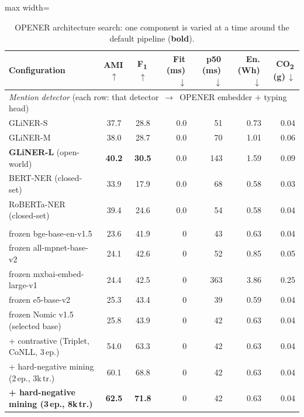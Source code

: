 \documentclass[pdflatex,sn-basic,Numbered]{sn-jnl}
\begin{document}
\begin{table}[!t]
\centering
\caption{OPENER architecture search: one component is varied at a time around the default pipeline (\textbf{bold}).}
\label{tab:ablation}
\small
\begin{adjustbox}{max width=\textwidth}
\begin{threeparttable}
\begin{tabular}{lccrrrr}
\toprule
Configuration & AMI\,$\uparrow$ & F\textsubscript{1}\,$\uparrow$ & Fit\,(ms)\,$\downarrow$ & p50\,(ms)\,$\downarrow$ & En.\,(Wh)\,$\downarrow$ & CO\textsubscript{2}\,(g)\,$\downarrow$ \\
\midrule
\multicolumn{7}{l}{\emph{Mention detector} (each row: that detector \,$\rightarrow$\, OPENER embedder $+$ typing head)} \\
\quad GLiNER-S                       & 37.7 & 28.8 & 0.0 & 51 & 0.73 & 0.04 \\
\quad GLiNER-M                       & 38.0 & 28.7 & 0.0 & 70 & 1.01 & 0.06 \\
\quad \textbf{GLiNER-L} (open-world) & \textbf{40.2} & \textbf{30.5} & 0.0 & 143 & 1.59 & 0.09 \\
\quad BERT-NER (closed-set) \cite{devlin2019bert}      & 33.9 & 17.9 & 0.0 & 68 & 0.58 & 0.03 \\
\quad RoBERTa-NER (closed-set) \cite{liu2019roberta}   & 39.4 & 24.6 & 0.0 & 54 & 0.58 & 0.04 \\
\addlinespace
\multicolumn{7}{l}{\emph{Entity embedder}\textsuperscript{a}} \\
\quad frozen bge-base-en-v1.5 \cite{xiao2024cpack}      & 23.6 & 41.9 & 0 & 43 & 0.63 & 0.04 \\
\quad frozen all-mpnet-base-v2 \cite{song2020mpnet}     & 24.1 & 42.6 & 0 & 52 & 0.85 & 0.05 \\
\quad frozen mxbai-embed-large-v1 \cite{li2024aoe}      & 24.4 & 42.5 & 0 & 363 & 3.86 & 0.25 \\
\quad frozen e5-base-v2 \cite{wang2022e5}               & 25.3 & 43.4 & 0 & 39 & 0.59 & 0.04 \\
\quad frozen Nomic v1.5 (selected base)                 & 25.8 & 43.9 & 0 & 42 & 0.63 & 0.04 \\
\quad + contrastive (Triplet, CoNLL, 3\,ep.)            & 54.0 & 63.3 & 0 & 42 & 0.63 & 0.04 \\
\quad + hard-negative mining (2\,ep., 3k\,tr.)          & 60.1 & 68.8 & 0 & 42 & 0.63 & 0.04 \\
\quad \textbf{+ hard-negative mining (3\,ep., 8k\,tr.)} & \textbf{62.5} & \textbf{71.8} & 0 & 42 & 0.63 & 0.04 \\

\end{tabular}
\end{threeparttable}
\end{adjustbox}
\end{table}
\end{document}
